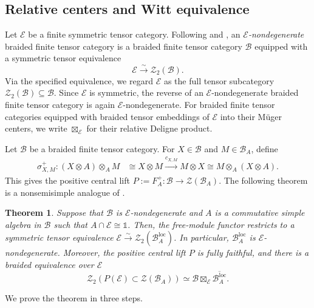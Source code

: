 \documentclass[10pt,a4paper]{amsart}
\numberwithin{equation}{section}
\newtheorem{theorem}[thmctr]{Theorem}
\newcommand{\unit}{\mathds{1}}
\newcommand{\B}{\mathcal{B}}
\newcommand{\E}{\mathcal{E}}
\newcommand{\Z}{\mathcal{Z}}
\newcommand{\loc}{\mathrm{loc}}
\begin{document}

\subsection{Relative centers and Witt equivalence}
\label{subsec:relative-centers-witt}

Let $\E$ be a finite symmetric tensor category. Following
\cite[Definition~4.1]{davydov2013structure} and
\cite[\S5.3]{decoppetstroinski2026pre}, an
\emph{$\E$-nondegenerate} braided finite tensor category is a braided finite
tensor category $\B$ equipped with a symmetric tensor equivalence
\[
  \E\xrightarrow{\sim}\Z_2(\B).
\]
Via the specified equivalence, we regard $\E$ as the full tensor subcategory
$\Z_2(\B)\subseteq\B$. Since $\E$ is symmetric, the reverse of an
$\E$-nondegenerate braided finite tensor category is again
$\E$-nondegenerate. For braided finite tensor categories equipped with braided
tensor embeddings of $\E$ into their M\"uger centers, we write
$\boxtimes_{\E}$ for their relative Deligne product.


Let $\B$ be a braided finite tensor category. 
For $X\in\B$ and $M\in\B_A$, define
\[
\begin{aligned}
  \sigma^+_{X,M}:(X\otimes A)\otimes_A M
  &\cong X\otimes M
  \xrightarrow{c_{X,M}} M\otimes X
  \cong M\otimes_A(X\otimes A).
\end{aligned}
\]
This gives the positive central lift $P:=F_A^+:\B\longrightarrow\Z(\B_A)$. 
The following theorem is a nonsemisimple analogue of
\cite[Corollary~4.6]{davydov2013structure}.


\begin{theorem}\label{thm:relative-center-local-modules}
Suppose that $\B$ is $\E$-nondegenerate and $A$ is
a commutative simple algebra in $\B$ such that $A\cap\E\cong\unit$. 
Then, the free-module functor restricts to a symmetric tensor equivalence
$\E\xrightarrow{\sim}\Z_2(\B_A^{\loc})$. In particular,
$\B_A^{\loc}$ is $\E$-nondegenerate. Moreover, the positive
central lift $P$ is fully faithful, and there is a braided equivalence over
$\E$
\[
  \Z_2(P(\E)\subset \Z(\B_A))
  \simeq
  \B\boxtimes_{\E}\overline{\B_A^{\loc}}.
\]
\end{theorem}


We prove the theorem in three steps. 
\end{document}
